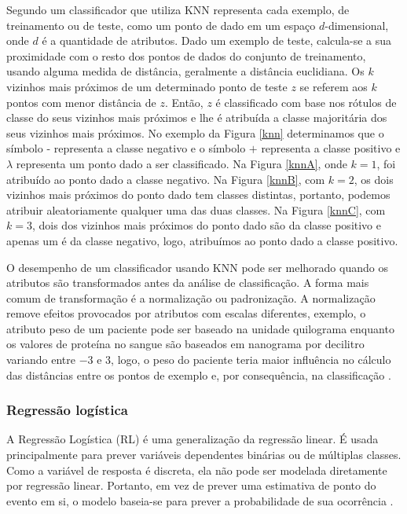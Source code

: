 \begin{figure}[!htb]
  \vspace{1.5em}
\end{figure}

Segundo  um classificador que utiliza KNN
representa cada exemplo, de treinamento ou de teste, como um ponto de dado em um
espaço \(d\)-dimensional, onde \(d\) é a quantidade de atributos. Dado um
exemplo de teste, calcula-se a sua proximidade com o resto dos pontos de dados
do conjunto de treinamento, usando alguma medida de distância, geralmente a
distância euclidiana. Os \(k\) vizinhos mais próximos de um determinado ponto de
teste \(z\) se referem aos \(k\) pontos com menor distância de \(z\). Então,
\(z\) é classificado com base nos rótulos de classe do seus vizinhos mais
próximos e lhe é atribuída a classe majoritária dos seus vizinhos mais próximos.
No exemplo da Figura \ref{knn} determinamos que o símbolo \(\textbf{-}\)
representa a classe negativo e o símbolo \(\textbf{+}\) representa a classe
positivo e \(\lambda\) representa um ponto dado a ser classificado. Na Figura
\ref{knnA}, onde \(k = 1\), foi atribuído ao ponto dado a classe negativo. Na
Figura \ref{knnB}, com \(k = 2\), os dois vizinhos mais próximos do ponto dado
tem classes distintas, portanto, podemos atribuir aleatoriamente qualquer uma
das duas classes. Na Figura \ref{knnC}, com \(k = 3\), dois dos vizinhos mais
próximos do ponto dado são da classe positivo e apenas um é da classe negativo,
logo, atribuímos ao ponto dado a classe positivo.

O desempenho de um classificador usando KNN pode ser melhorado quando os
atributos são transformados antes da análise de classificação. A forma mais
comum de transformação é a normalização ou padronização. A normalização remove
efeitos provocados por atributos com escalas diferentes, exemplo, o atributo
peso de um paciente pode ser baseado na unidade quilograma enquanto os valores
de proteína no sangue são baseados em nanograma por decilitro variando entre
\(-3\) e \(3\), logo, o peso do paciente teria maior influência no cálculo das
distâncias entre os pontos de exemplo e, por consequência, na classificação
\cite{peterson2009knn}.

\subsubsection{Regressão logística}

A Regressão Logística (RL) é uma generalização da regressão linear. É usada
principalmente para prever variáveis dependentes binárias ou de múltiplas
classes. Como a variável de resposta é discreta, ela não pode ser modelada
diretamente por regressão linear. Portanto, em vez de prever uma estimativa de
ponto do evento em si, o modelo baseia-se para prever a probabilidade de sua
ocorrência \cite{csen2012predicting}.

